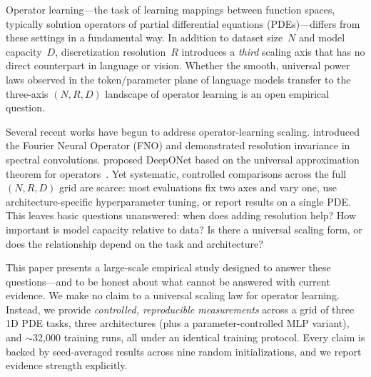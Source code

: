 \documentclass[11pt]{article}
\begin{document}
Operator learning---the task of learning mappings between function
spaces, typically solution operators of partial differential equations
(PDEs)---differs from these settings in a fundamental way.
In addition to dataset size~$N$ and model capacity~$D$, discretization
resolution~$R$ introduces a \emph{third} scaling axis that has no
direct counterpart in language or vision.
Whether the smooth, universal power laws observed in the token/parameter
plane of language models transfer to the three-axis
$(N, R, D)$ landscape of operator learning is an open empirical
question.

Several recent works have begun to address operator-learning scaling.
\citet{li2021fourier} introduced the Fourier Neural Operator (FNO) and
demonstrated resolution invariance in spectral convolutions.
\citet{lu2021learning} proposed DeepONet based on the universal
approximation theorem for operators~\citep{chen1995universal}.
Yet systematic, controlled comparisons across the full $(N, R, D)$ grid
are scarce: most evaluations fix two axes and vary one, use
architecture-specific hyperparameter tuning, or report results on a
single PDE.
This leaves basic questions unanswered: when does adding resolution
help? How important is model capacity relative to data? Is there a
universal scaling form, or does the relationship depend on the task
and architecture?

This paper presents a large-scale empirical study designed to answer
these questions---and to be honest about what cannot be answered with
current evidence.
We make no claim to a universal scaling law for operator learning.
Instead, we provide \emph{controlled, reproducible measurements} across
a grid of three 1D PDE tasks, three architectures (plus a
parameter-controlled MLP variant), and $\sim$32{,}000 training runs,
all under an identical training protocol.
Every claim is backed by seed-averaged results across nine
random initializations, and we report evidence strength explicitly.
\end{document}
